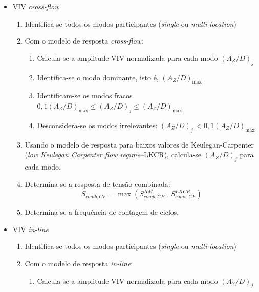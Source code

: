 \begin{itemize}

\item VIV \textit{cross-flow}\label{procedure_il}

\begin{enumerate}
\item Identifica-se todos os modos participantes (\textit{single} ou \textit{multi location})

\item Com o modelo de resposta \textit{cross-flow}:
	\begin{enumerate}
    \item Calcula-se a amplitude VIV normalizada para cada modo ${(A_Z/D)}_j$

	\item Identifica-se o modo dominante, isto é, ${(A_Z/D)}_{\max}$

    \item Identificam-se os modos fracos $0,1{(A_Z/D)}_{\max} \leq {(A_Z/D)}_j \leq {(A_Z/D)}_{\max}$

    \item Desconsidera-se os modos irrelevantes: ${(A_Z/D)}_j$ < $0,1{(A_Z/D)}_{\max}$
    \end{enumerate}

\item Usando o modelo de resposta para baixos valores de Keulegan-Carpenter (\textit{low Keulegan Carpenter flow regime}--LKCR), calcula-se ${(A_Z/D)}_j$ para cada modo.

\item Determina-se a resposta de tensão combinada:
    \[
    S_{\mathit{comb}, \mathit{CF}} = \max\left( S_{\mathit{comb}, \mathit{CF}}^\mathit{RM} ~,~ S_{\mathit{comb}, \mathit{CF}}^\mathit{LKCR} \right)
    \]

\item Determina-se a frequência de contagem de ciclos.

\end{enumerate}

\item VIV \textit{in-line}

\begin{enumerate}
    \item Identifica-se todos os modos participantes (\textit{single} ou \textit{multi location})

    \item Com o modelo de resposta \textit{in-line}:

    \begin{enumerate}
    	\item Calcula-se a amplitude VIV normalizada para cada modo ${(A_Y/D)}_j$


\end{enumerate}
\end{enumerate}
\end{itemize}
